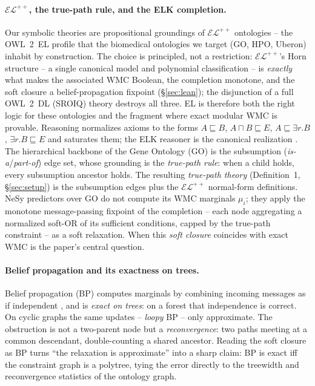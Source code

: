 \documentclass[anon]{nesy2026}
\newcommand{\WMC}{\ensuremath{\mathrm{WMC}}}
\begin{document}
\paragraph{$\mathcal{EL}^{++}$, the true-path rule, and the ELK completion.}
Our symbolic theories are propositional groundings of $\mathcal{EL}^{++}$ ontologies -- the OWL~2~EL profile \citep{baader2005elenvelope} that the biomedical ontologies we target (GO, HPO, Uberon) inhabit by construction. The choice is principled, not a restriction: $\mathcal{EL}^{++}$'s Horn structure -- a single canonical model and polynomial classification -- is \emph{exactly} what makes the associated $\WMC$ Boolean, the completion monotone, and the soft closure a belief-propagation fixpoint (\S\ref{sec:lean}); the disjunction of a full OWL~2~DL (SROIQ) theory destroys all three. EL is therefore both the right logic for these ontologies and the fragment where exact modular WMC is provable. Reasoning normalizes axioms to the forms $A\sqsubseteq B$, $A\sqcap B\sqsubseteq E$, $A\sqsubseteq \exists r.B$, $\exists r.B\sqsubseteq E$ and saturates them; the ELK reasoner is the canonical realization \citep{kazakov2014elk}. The hierarchical backbone of the Gene Ontology (GO) \citep{ashburner2000go,geneontology2023} is the subsumption (\textit{is-a}/\textit{part-of}) edge set, whose grounding is the \emph{true-path rule}: when a child holds, every subsumption ancestor holds. The resulting \emph{true-path theory} (Definition~1, \S\ref{sec:setup}) is the subsumption edges plus the $\mathcal{EL}^{++}$ normal-form definitions. NeSy predictors over GO do not compute its $\WMC$ marginals $\mu_i$; they apply the monotone message-passing fixpoint of the completion -- each node aggregating a normalized soft-OR of its sufficient conditions, capped by the true-path constraint -- as a soft relaxation. When this \emph{soft closure} coincides with exact $\WMC$ is the paper's central question.

\paragraph{Belief propagation and its exactness on trees.}
Belief propagation (BP) computes marginals by combining incoming messages as if independent \citep{pearl1988probabilistic}, and is \emph{exact on trees}: on a forest that independence is correct. On cyclic graphs the same updates -- \emph{loopy} BP -- only approximate. The obstruction is not a two-parent node but a \emph{reconvergence}: two paths meeting at a common descendant, double-counting a shared ancestor. Reading the soft closure as BP turns ``the relaxation is approximate'' into a sharp claim: BP is exact iff the constraint graph is a polytree, tying the error directly to the treewidth and reconvergence statistics of the ontology graph.
\end{document}
